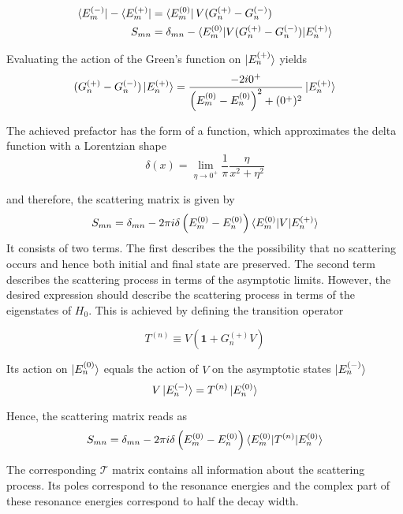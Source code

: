 \begin{align}
  \bra{E_m^{(-)}} - \bra{E_m^{(+)}} &= \bra{E_m^{(0)}} V (G_n^{(+)} - G_n^{(-)} ) \\
  S_{mn} &= \delta_{mn} - \braket{E_m^{(0)}| V (G_n^{(+)} - G_n^{(-)}) |E_n^{(+)}} 
\end{align}

Evaluating the action of the Green's function on $\ket{E_n^{(+)}}$ yields
\begin{equation}
 (G_n^{(+)} - G_n^{(-)}) \ket{E_n^{(+)}} 
 = \frac{-2i0^+}{\left( E_m^{(0)} - E_n^{(0)} \right)^2 + (0^+)^2} \ket{E_n^{(+)}}
\end{equation}


The achieved prefactor has the form of a function, which approximates the delta
function with a Lorentzian shape
\begin{equation}
 \delta(x) = \lim_{\eta \to 0^+} \frac{1}{\pi} \frac{\eta}{x^2 + \eta^2}
\end{equation}

and therefore, the scattering matrix is given by
\begin{equation}
 S_{mn} = \delta_{mn} - 2\pi i \delta \left(E_m^{(0)} - E_n^{(0)} \right)
          \braket{E_m^{(0)}| V |E_n^{(+)}}
\end{equation}
It consists of two terms. The first describes the the possibility that no scattering
occurs and hence both initial and final state are preserved. The second term
describes the scattering process in terms of the asymptotic limits. However,
the desired expression should describe the scattering process in terms of the
eigenstates of $H_0$. This is achieved by defining the transition operator

\begin{equation}
 T^{(n)} \equiv V \left( \mathbf{1} + G_n^{(+)} V \right)
\end{equation}

Its action on $\ket{E_n^{(0)}}$ equals the action of $V$ on the asymptotic
states $\ket{E_n^{(-)}}$
\begin{equation}
 V \ket{E_n^{(-)}} = T^{(n)} \ket{E_n^{(0)}}
\end{equation}

Hence, the scattering matrix reads as
\begin{equation}
 S_{mn} = \delta_{mn} - 2\pi i \delta \left(E_m^{(0)} - E_n^{(0)} \right)
          \braket{E_m^{(0)}| T^{(n)} |E_n^{(0)}}
\end{equation}

The corresponding $\mathcal{T}$ matrix contains all information about the
scattering process. Its poles correspond to the resonance energies and
the complex part of these resonance energies correspond to half the decay width.

